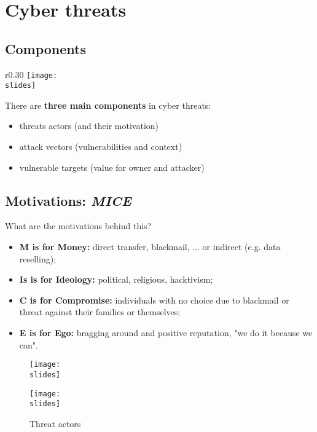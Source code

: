 
\section{Cyber threats}

\subsection*{Components}
\begin{wrapfigure}{r}{0.30\textwidth}
  \centering
  \texttt{[image: \\slides]}
\end{wrapfigure}
There are \textbf{three main components} in cyber threats:
\begin{itemize}
  \item threats actors (and their motivation)
  \item attack vectors (vulnerabilities and context)
  \item vulnerable targets (value for owner and attacker)
\end{itemize}


\subsection*{Motivations: \emph{MICE}}
What are the motivations behind this?
\begin{itemize}
  \item \textbf{M is for Money:} direct transfer, blackmail, ... or indirect (e.g. data reselling);
  \item \textbf{Is is for Ideology:} political, religious, hacktivism;
  \item \textbf{C is for Compromise:} individuals with no choice due to blackmail or threat against their families or themselves;
  \item \textbf{E is for Ego:} bragging around and positive reputation, "we do it because we can".
\end{itemize}
\begin{figure}[h]
  \texttt{[image: \\slides]}
\end{figure}
\begin{figure}[h]
  \centering
  \texttt{[image: \\slides]}
  \caption{Threat actors}
\end{figure}

